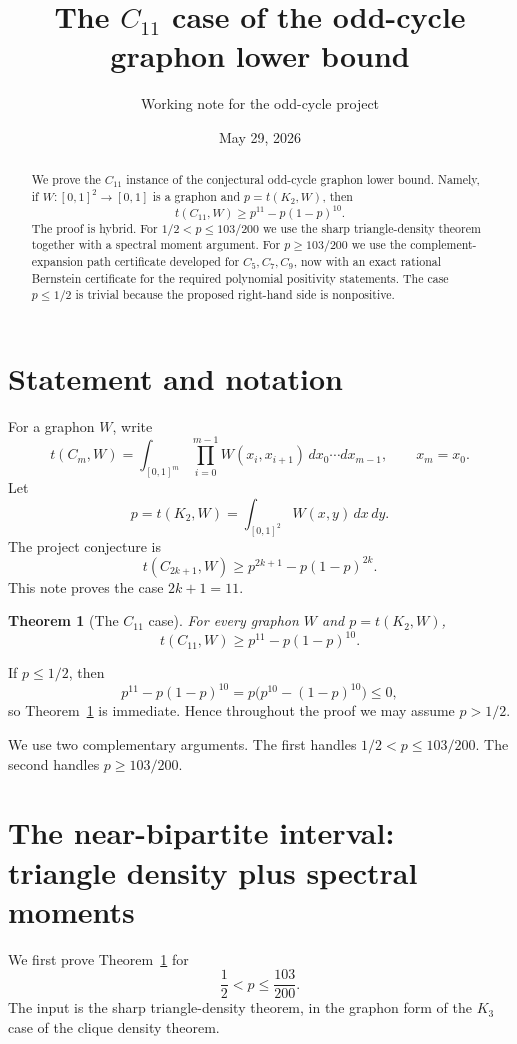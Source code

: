 \documentclass[11pt]{article}
\title{The $C_{11}$ case of the odd-cycle graphon lower bound}
\author{Working note for the odd-cycle project}
\date{May 29, 2026}
\newtheorem{theorem}{Theorem}[section]
\begin{document}
\maketitle

\begin{abstract}
We prove the $C_{11}$ instance of the conjectural odd-cycle graphon lower bound.  Namely, if $W\colon[0,1]^2\to[0,1]$ is a graphon and $p=t(K_2,W)$, then
\[
        t(C_{11},W)\ge p^{11}-p(1-p)^{10}.
\]
The proof is hybrid.  For $1/2<p\le 103/200$ we use the sharp triangle-density theorem together with a spectral moment argument.  For $p\ge 103/200$ we use the complement-expansion path certificate developed for $C_5,C_7,C_9$, now with an exact rational Bernstein certificate for the required polynomial positivity statements.  The case $p\le1/2$ is trivial because the proposed right-hand side is nonpositive.
\end{abstract}

\section{Statement and notation}

For a graphon $W$, write
\[
        t(C_m,W)=\int_{[0,1]^m}\prod_{i=0}^{m-1}W(x_i,x_{i+1})\,dx_0\cdots dx_{m-1},
        \qquad x_m=x_0.
\]
Let
\[
        p=t(K_2,W)=\int_{[0,1]^2}W(x,y)\,dx\,dy.
\]
The project conjecture is
\[
        t(C_{2k+1},W)\ge p^{2k+1}-p(1-p)^{2k}.
\]
This note proves the case $2k+1=11$.

\begin{theorem}[The $C_{11}$ case]\label{thm:C11}
For every graphon $W$ and $p=t(K_2,W)$,
\[
        t(C_{11},W)\ge p^{11}-p(1-p)^{10}.
\]
\end{theorem}

If $p\le1/2$, then
\[
        p^{11}-p(1-p)^{10}=p\bigl(p^{10}-(1-p)^{10}\bigr)\le0,
\]
so Theorem~\ref{thm:C11} is immediate.  Hence throughout the proof we may assume $p>1/2$.

We use two complementary arguments.  The first handles $1/2<p\le103/200$.  The second handles $p\ge103/200$.

\section{The near-bipartite interval: triangle density plus spectral moments}

We first prove Theorem~\ref{thm:C11} for
\[
        \frac12<p\le\frac{103}{200}.
\]
The input is the sharp triangle-density theorem, in the graphon form of the $K_3$ case of the clique density theorem.
\end{document}
